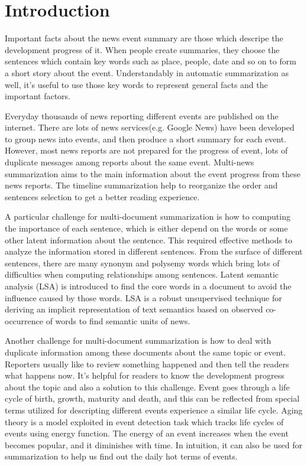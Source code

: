 \documentclass[print]{jicspack}
\begin{document}
\section{Introduction}
\label{Introduction}
Important facts about the news event summary are those which descripe the development progress of it.
When people create summaries, they choose the sentences which contain key words such as place, people, date and so on to form a short story about the event.
Understandably in automatic summarization as well, it's useful to use those key words to represent general facts and the important factors.

Everyday thousands of news reporting different events are published on the internet. 
There are lots of news services(e.g. Google News) have been developed to group news into events, and then produce a short summary for each event.
However, most news reports are not prepared for the progress of event, lots of duplicate messages among reports about the same event. 
Multi-news summarization aims to the main information about the event progress from these news reports.
The timeline summarization help to reorganize the order and sentences selection to get a better reading experience.

A particular challenge for multi-document summarization is how to computing the importance of each sentence, which is either depend on the words or some other latent information about the sentence.
This required effective methods to analyze the information stored in different sentences.
From the surface of different sentences, there are many synonym and polysemy words which bring lots of difficulties when computing relationships among sentences.
Latent semantic analysis (LSA) \cite{1990-Deerwester-p391-407} is introduced to find the core words in a document to avoid the influence caused by those words.
LSA is a robust unsupervised technique for deriving an implicit representation of text semantics based on observed co-occurrence of words to find semantic units of news.


Another challenge for multi-document summarization is how to deal with duplicate information among these documents about the same topic or event.
Reporters usually like to review something happened and then tell the readers what happens now. 
It's helpful for readers to know the development progress about the topic and also a solution to this challenge.
Event goes through a life cycle of birth, growth, maturity and death, and this can be reflected from special terms utilized for descripting different events experience a similar life cycle. 
Aging theory \cite{chen2003life} is a model exploited in event detection task which tracks life cycles of events using energy function. 
The energy of an event increases when the event becomes popular, and it diminishes with time. 
In intuition, it can also be used for summarization to help us find out the daily hot terms of events. 
\end{document}
